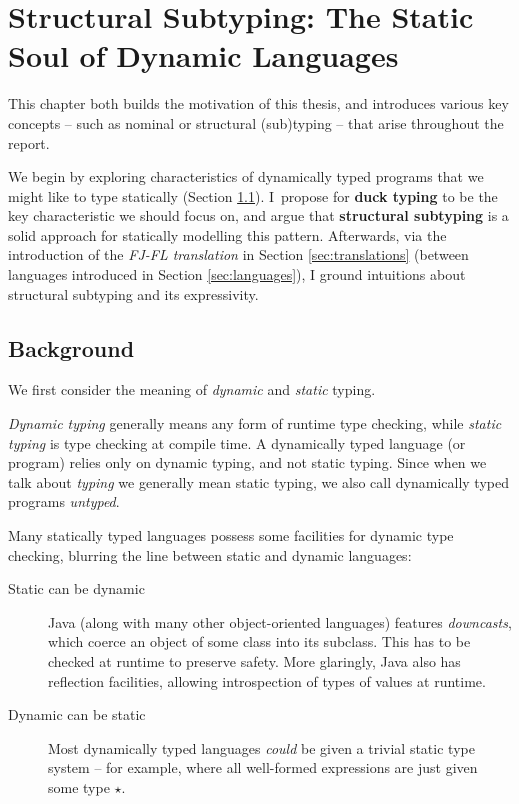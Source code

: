 \chapter
    [Structural Subtyping: The Static Soul of Dynamic Languages]
    {Structural Subtyping: \newline The Static Soul of Dynamic Languages}
\label{static-soul}

This chapter both builds the motivation of this thesis, and introduces various key concepts -- such as nominal or structural (sub)typing -- that arise throughout the report.

We begin by exploring characteristics of dynamically typed programs that we might like to type statically (Section \ref{sec:ch2background}). I~propose for \textbf{duck typing} to be the key characteristic we should focus on, and argue that \textbf{structural subtyping} is a solid approach for statically modelling this pattern. Afterwards, via the introduction of the \emph{FJ-FL translation} in Section \ref{sec:translations} (between languages introduced in Section \ref{sec:languages}), I ground intuitions about structural subtyping and its expressivity.

\section{Background}
\label{sec:ch2background}

We first consider the meaning of \emph{dynamic} and \emph{static} typing.

\emph{Dynamic typing} generally means any form of runtime type checking, while \emph{static typing} is type checking at compile time. A dynamically typed language (or program) relies only on dynamic typing, and not static typing. Since when we talk about \emph{typing} we generally mean static typing, we also call dynamically typed programs \emph{untyped}.

Many statically typed languages possess some facilities for dynamic type checking, blurring the line between static and dynamic languages: \begin{description}
    \item[Static can be dynamic] Java (along with many other object-oriented languages) features \textit{downcasts}, which coerce an object of some class into its subclass. This has to be checked at runtime to preserve safety. 
    More glaringly, Java also has reflection facilities, allowing introspection of types of values at runtime. 
    \item[Dynamic can be static] Most dynamically typed languages \emph{could} be given a trivial static type system -- for example, where all well-formed expressions are just given some type $\star$. 
\end{description} 

